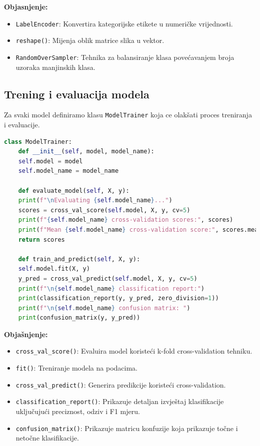 \documentclass[zavrsnirad]{fer}
\begin{document}
\noindent \textbf{Objasnjenje:}
\begin{itemize}
	\item \texttt{LabelEncoder}: Konvertira kategorijske etikete u numeričke vrijednosti.
	\item \texttt{reshape()}: Mijenja oblik matrice slika u vektor.
	\item \texttt{RandomOverSampler}: Tehnika za balansiranje klasa povećavanjem broja uzoraka manjinskih klasa.
\end{itemize}

\subsection{Trening i evaluacija modela}

Za svaki model definiramo klasu \texttt{ModelTrainer} koja ce olakšati proces treniranja i evaluacije.

\begin{lstlisting}[language=Python, caption={Klasa ModelTrainer}]
	class ModelTrainer:
	def __init__(self, model, model_name):
	self.model = model
	self.model_name = model_name
	
	def evaluate_model(self, X, y):
	print(f"\nEvaluating {self.model_name}...")
	scores = cross_val_score(self.model, X, y, cv=5)
	print(f"{self.model_name} cross-validation scores:", scores)
	print(f"Mean {self.model_name} cross-validation score:", scores.mean())
	return scores
	
	def train_and_predict(self, X, y):
	self.model.fit(X, y)
	y_pred = cross_val_predict(self.model, X, y, cv=5)
	print(f"\n{self.model_name} classification report:")
	print(classification_report(y, y_pred, zero_division=1))
	print(f"\n{self.model_name} confusion matrix: ")
	print(confusion_matrix(y, y_pred))
\end{lstlisting}

\noindent \textbf{Objašnjenje:}
\begin{itemize}
	\item \texttt{cross\_val\_score()}: Evaluira model koristeći k-fold cross-validation tehniku.
	\item \texttt{fit()}: Treniranje modela na podacima.
	\item \texttt{cross\_val\_predict()}: Generira predikcije koristeći cross-validation.
	\item \texttt{classification\_report()}: Prikazuje detaljan izvještaj klasifikacije uključujući preciznost, odziv i F1 mjeru.
	\item \texttt{confusion\_matrix()}: Prikazuje matricu konfuzije koja prikazuje točne i netočne klasifikacije.
\end{itemize}
\end{document}
